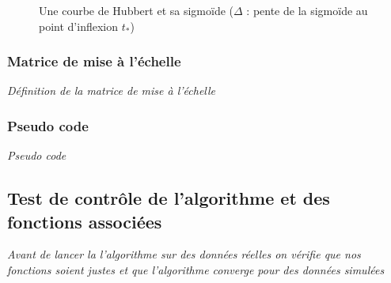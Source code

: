 \documentclass{article}
\begin{document}
\begin{figure}[h]
	\centering
    \caption{Une courbe de Hubbert et sa sigmoïde ($\Delta$ : pente de la sigmoïde au point d'inflexion $t_*$) }
\end{figure}



\subsubsection{Matrice de mise à l'échelle}
\textit{Définition de la matrice de mise à l'échelle}



\subsubsection{Pseudo code}
\textit{Pseudo code}



\subsection{Test de contrôle de l'algorithme et des fonctions associées}
\textit{Avant de lancer la l'algorithme sur des données réelles on vérifie que nos fonctions soient justes et que l'algorithme converge pour des données simulées}
\end{document}
